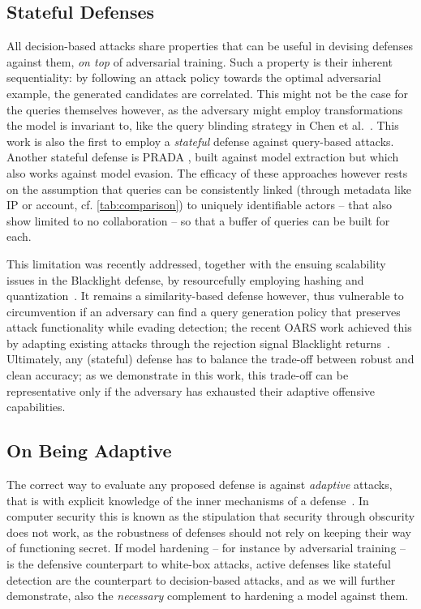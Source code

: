\subsection{Stateful Defenses}
All decision-based attacks share properties that can be useful in devising defenses against them, \textit{on top} of adversarial training.
Such a property is their inherent sequentiality: by following an attack policy towards the optimal adversarial example, the generated candidates are correlated.
This might not be the case for the queries themselves however, as the adversary might employ transformations the model is invariant to, like the query blinding strategy in Chen et al.~\cite{chen2020stateful}.
This work is also the first to employ a \emph{stateful} defense against query-based attacks.
Another stateful defense is PRADA \cite{juuti2019prada}, built against model extraction but which also works against model evasion.
The efficacy of these approaches however rests on the assumption that queries can be consistently linked (through metadata like IP or account, cf. \autoref{tab:comparison}) to uniquely identifiable actors -- that also show limited to no collaboration -- so that a buffer of queries can be built for each.

This limitation was recently addressed, together with the ensuing scalability issues in the Blacklight defense, by resourcefully employing hashing and quantization~\cite{li2022blacklight}.
It remains a similarity-based defense however, thus vulnerable to circumvention if an adversary can find a query generation policy that preserves attack functionality while evading detection; the recent OARS work achieved this by adapting existing attacks through the rejection signal Blacklight returns~\cite{feng2023stateful}.
Ultimately, any (stateful) defense has to balance the trade-off between robust and clean accuracy; as we demonstrate in this work, this trade-off can be representative only if the adversary has exhausted their adaptive offensive capabilities.

\subsection{On Being Adaptive}
\label{sub:adaptive}

The correct way to evaluate any proposed defense is against \emph{adaptive} attacks, that is with explicit knowledge of the inner mechanisms of a defense~\cite{tramer2020adaptive}.
In computer security this is known as the stipulation that security through obscurity does not work, as the robustness of defenses should not rely on keeping their way of functioning secret.
If model hardening -- for instance by adversarial training -- is the defensive counterpart to white-box attacks, active defenses like stateful detection are the counterpart to decision-based attacks, and as we will further demonstrate, also the \emph{necessary} complement to hardening a model against them.

